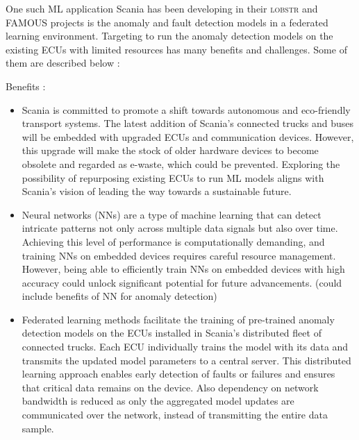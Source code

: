 One such ML application Scania has been developing in their \textsc{lobstr }\cite{lobstr} and \textsc{FAMOUS} projects is the anomaly and fault detection models in a federated learning environment. Targeting to run the anomaly detection models on the existing ECUs with limited resources has many benefits and challenges. Some of them are described below :

Benefits :
\begin{itemize}
	\item Scania is committed to promote a shift towards autonomous and eco-friendly transport systems. The latest addition of Scania's connected trucks and buses will be embedded with upgraded ECUs and communication devices. However, this upgrade will make the stock of older hardware devices to become obsolete and regarded as e-waste, which could be prevented. Exploring the possibility of repurposing existing ECUs to run ML models aligns with Scania's vision of leading the way towards a sustainable future. 
	\item Neural networks (NNs) are a type of machine learning that can detect intricate patterns not only across multiple data signals but also over time. Achieving this level of performance is computationally demanding, and training NNs on embedded devices requires careful resource management. However, being able to efficiently train NNs on embedded devices with high accuracy could unlock significant potential for future advancements. (could include benefits of NN for anomaly detection)
	\item Federated learning methods facilitate the training of pre-trained anomaly detection models on the ECUs installed in Scania's distributed fleet of connected trucks. Each ECU individually trains the model with its data and transmits the updated model parameters to a central server. This distributed learning approach enables early detection of faults or failures and ensures that critical data remains on the device. Also dependency on network bandwidth is reduced as only the aggregated model updates are communicated over the network, instead of transmitting the entire data sample.
\end{itemize}

